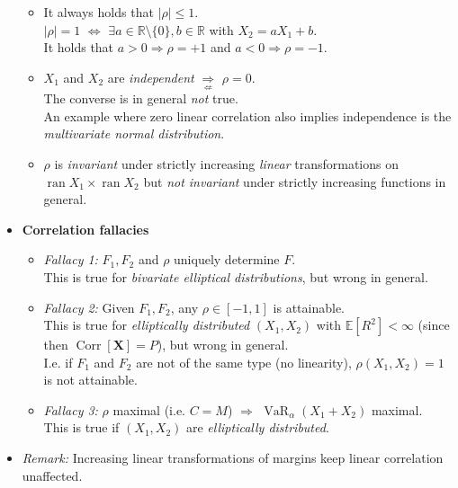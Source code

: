 \documentclass[a4paper,landscape,8pt,fleqn]{scrartcl}
\renewcommand{\emph}[1]{\textbf{#1}}
\DeclareMathOperator{\Corr}{Corr}				%
\DeclareMathOperator{\VaR}{VaR}				%
\DeclareMathOperator{\ran}{ran}				%
\begin{document}
\begin{multicols*}{3}
\begin{itemize}
\begin{itemize}
\item It always holds that $|\rho| \leq 1$. \\
$|\rho| = 1$ $\iff$ $\exists a \in \mathbb{R} \setminus \lbrace 0 \rbrace, b \in \mathbb{R}$ with $X_2 = a X_1 + b$. \\
It holds that $a > 0 \Rightarrow \rho = +1$ and $a < 0 \Rightarrow \rho = -1$.
\item $X_1$ and $X_2$ are \textit{independent} $\underset{\not \Leftarrow}{\Rightarrow}$ $\rho = 0$. \\
The converse is in general \textit{not} true. \\
An example where zero linear correlation also implies independence is the \textit{multivariate normal distribution}.
\item $\rho$ is \textit{invariant} under strictly increasing \textit{linear} transformations on $\ran X_1 \times \ran X_2$ but \textit{not invariant} under strictly increasing functions in general.
\end{itemize}
\item \emph{Correlation fallacies}
\begin{itemize}
\item \textit{Fallacy 1:} $F_1, F_2$ and $\rho$ uniquely determine $F$. \\
This is true for \textit{bivariate elliptical distributions}, but wrong in general.
\item \textit{Fallacy 2:} Given $F_1, F_2$, any $\rho \in [-1,1]$ is attainable. \\
This is true for \textit{elliptically distributed} $(X_1, X_2)$ with $\mathbb{E}[R^2] < \infty$ (since then $\Corr[\bm X] = P$), but wrong in general. \\
I.e. if $F_1$ and $F_2$ are not of the same type (no linearity), $\rho(X_1, X_2) = 1$ is not attainable.
\item \textit{Fallacy 3:} $\rho$ maximal (i.e. $C = M$) $\Rightarrow$ $\VaR_\alpha(X_1 + X_2)$ maximal. \\
This is true if $(X_1, X_2)$ are \textit{elliptically distributed}.
\end{itemize}
\item \textit{Remark:} Increasing linear transformations of margins keep linear correlation unaffected.
\end{itemize}


\end{multicols*}
\end{document}
